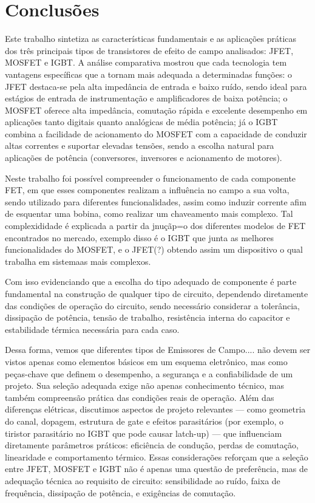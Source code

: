 \documentclass[12pt]{article}
\begin{document}
\section{Conclusões}
    Este trabalho sintetiza as características fundamentais e as aplicações práticas dos três principais tipos de transistores de efeito de campo analisados: JFET, MOSFET e IGBT. A análise comparativa mostrou que cada tecnologia tem vantagens específicas que a tornam mais adequada a determinadas funções: o JFET destaca-se pela alta impedância de entrada e baixo ruído, sendo ideal para estágios de entrada de instrumentação e amplificadores de baixa potência; o MOSFET oferece alta impedância, comutação rápida e excelente desempenho em aplicações tanto digitais quanto analógicas de média potência; já o IGBT combina a facilidade de acionamento do MOSFET com a capacidade de conduzir altas correntes e suportar elevadas tensões, sendo a escolha natural para aplicações de potência (conversores, inversores e acionamento de motores).

    Neste trabalho foi possível compreender o funcionamento de cada componente FET, em que esses componentes realizam a influência no campo a sua volta, sendo utilizado para diferentes funcionalidades, assim como induzir corrente afim de esquentar uma bobina, como realizar um chaveamento mais complexo. Tal complexididade é explicada a partir da jnuçãp=o dos diferentes modelos de FET encontrados no mercado, exemplo disso é o IGBT que junta as melhores funcionalidades do MOSFET, e o JFET(?) obtendo assim um dispositivo o qual trabalha em sistemaas mais complexos.

    Com isso evidenciando que a escolha do tipo adequado de componente é parte fundamental na construção de qualquer tipo de circuito, dependendo diretamente das condições de operação do circuito, sendo necessário considerar a tolerância, dissipação de potência, tensão de trabalho, resistência interna do capacitor e estabilidade térmica necessária para cada caso.

    Dessa forma, vemos que diferentes tipos de Emissores de Campo.... não devem ser vistos apenas como elementos básicos em um esquema eletrônico, mas como peças-chave que definem o desempenho, a segurança e a confiabilidade de um projeto. Sua seleção adequada exige não apenas conhecimento técnico, mas também compreensão prática das condições reais de operação.
    Além das diferenças elétricas, discutimos aspectos de projeto relevantes — como geometria do canal, dopagem, estrutura de gate e efeitos parasitários (por exemplo, o tiristor parasitário no IGBT que pode causar latch-up) — que influenciam diretamente parâmetros práticos: eficiência de condução, perdas de comutação, linearidade e comportamento térmico. Essas considerações reforçam que a seleção entre JFET, MOSFET e IGBT não é apenas uma questão de preferência, mas de adequação técnica ao requisito de circuito: sensibilidade ao ruído, faixa de frequência, dissipação de potência, e exigências de comutação.
\end{document}
